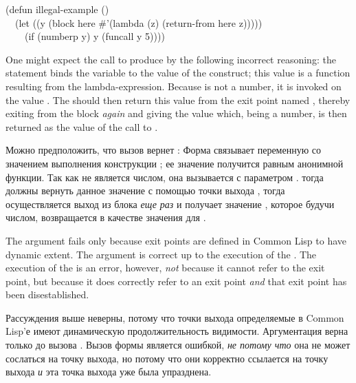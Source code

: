 \begin{lisp}
(defun illegal-example () \\
~~(let ((y (block here \#'(lambda (z) (return-from here z))))) \\
~~~~(if (numberp y) y (funcall y 5))))
\end{lisp}

One might expect the call  to produce 
by the following incorrect reasoning:
the  statement binds the variable  to the
value of the  construct; this value is a function resulting
from the lambda-expression.  Because  is not a number, it is
invoked on the value .  The  should then
return this value from the exit point named , thereby
exiting from the block {\it again} and giving  the value 
which, being a number, is then returned as the value of the call
to .

Можно предположить, что вызов  вернет :
Форма  связывает переменную  со значением выполнения конструкции
; ее значение получится равным анонимной функции. Так как  не
является числом, она вызывается с параметром .  тогда
должны вернуть данное значение с помощью точки выхода , тогда
осуществляется выход из блока {\it еще раз} и  получает значение ,
которое будучи числом, возвращается в качестве значения для .

The argument fails only because exit points are defined in Common Lisp
to have dynamic extent.  The argument is correct up to the execution
of the .  The execution of the  is
an error, however, {\it not} because it cannot refer to the exit point,
but because it does correctly refer to an exit point {\it and}
that exit point has been disestablished.

Рассуждения выше неверны, потому что точки выхода определяемые в
Common Lisp'е имеют динамическую продолжительность видимости. Аргументация верна
только до вызова . Вызов формы  является
ошибкой, {\it не потому что} она не может сослаться на точку выхода, но потому
что они корректно ссылается на точку выхода {\it и} эта точка выхода уже была
упразднена.